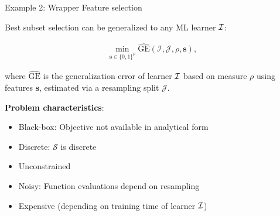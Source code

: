 \documentclass[11pt,compress,t,notes=noshow, xcolor=table]{beamer}
\begin{document}
	
\begin{vbframe}{Example 2: Wrapper Feature selection}

Best subset selection can be generalized to any ML learner $\mathcal{I}$:

\begin{eqnarray*}
	\min_{\textbf{s} \in \{0, 1\}^p} \widehat{\text{GE}}(\mathcal{I}, \mathcal{J}, \rho, \bm{s}),
\end{eqnarray*}

where $\widehat{\text{GE}}$ is the generalization error of learner $\mathcal{I}$ based on measure $\rho$ using features $\bm{s}$, estimated via a resampling split $\mathcal{J}$. 

\lz 

\textbf{Problem characteristics}:
\begin{itemize}
	\item Black-box: Objective not available in analytical form
	\item Discrete: $\mathcal{S}$ is discrete
	\item Unconstrained
	\item Noisy: Function evaluations depend on resampling
	\item Expensive (depending on training time of learner $\mathcal{I}$)
\end{itemize}

\end{vbframe}
\end{document}
